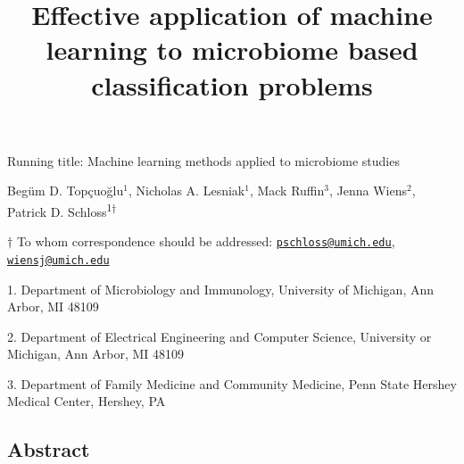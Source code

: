 \documentclass[11pt,]{article}
\title{\textbf{Effective application of machine learning to microbiome based
classification problems}}
\author{}
\date{}
\begin{document}
\maketitle

\vspace{35mm}

Running title: Machine learning methods applied to microbiome studies

\vspace{35mm}

Begüm D. Topçuoğlu\({^1}\), Nicholas A. Lesniak\({^1}\), Mack
Ruffin\({^3}\), Jenna Wiens\({^2}\), Patrick D.
Schloss\textsuperscript{1\(\dagger\)}

\vspace{38mm}

\(\dagger\) To whom correspondence should be addressed:
\href{mailto:pschloss@umich.edu}{\nolinkurl{pschloss@umich.edu}},
\href{mailto:wiensj@umich.edu}{\nolinkurl{wiensj@umich.edu}}

1. Department of Microbiology and Immunology, University of Michigan,
Ann Arbor, MI 48109

2. Department of Electrical Engineering and Computer Science, University
or Michigan, Ann Arbor, MI 48109

3. Department of Family Medicine and Community Medicine, Penn State
Hershey Medical Center, Hershey, PA

\newpage

\linenumbers

\subsection{Abstract}\label{abstract}
\end{document}
